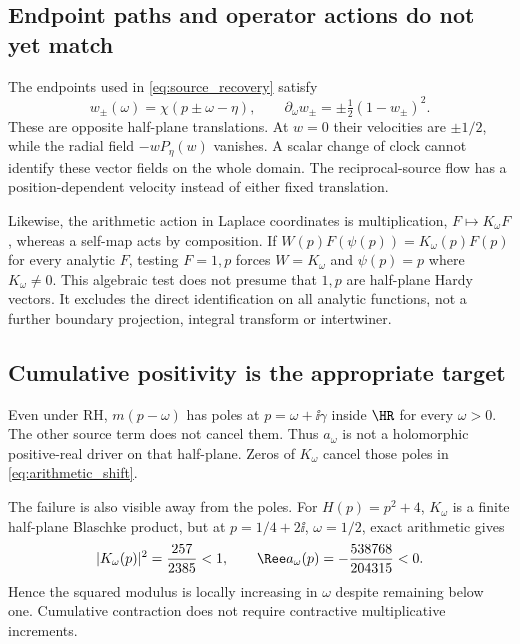 \subsection{Endpoint paths and operator actions do not yet match}

The endpoints used in \eqref{eq:source_recovery} satisfy
\begin{equation}
 w_\pm(\omega)=\chi(p\pm\omega-\eta),\qquad
 \partial_\omega w_\pm=\pm\tfrac12(1-w_\pm)^2.
\end{equation}
These are opposite half-plane translations. At $w=0$ their velocities
are $\pm1/2$, while the radial field $-wP_\eta(w)$ vanishes.
A scalar change of clock cannot identify these vector fields on the whole
domain. The reciprocal-source flow has a position-dependent velocity
instead of either fixed translation.

Likewise, the arithmetic action in Laplace coordinates is multiplication,
$F\mapsto K_\omega F$, whereas a self-map acts by composition.
If $W(p)F(\psi(p))=K_\omega(p)F(p)$ for every analytic $F$, testing
$F=1,p$ forces $W=K_\omega$ and $\psi(p)=p$ where $K_\omega\ne0$.
This algebraic test does not presume that $1,p$ are half-plane Hardy
vectors. It excludes the direct identification on all analytic functions,
not a further boundary projection, integral transform or intertwiner.

\subsection{Cumulative positivity is the appropriate target}

Even under RH, $m(p-\omega)$ has poles at $p=\omega+\ii\gamma$
inside $\HR$ for every $\omega>0$. The other source term does not
cancel them. Thus $a_\omega$ is not a holomorphic positive-real driver
on that half-plane. Zeros of $K_\omega$ cancel those poles in
\eqref{eq:arithmetic_shift}.

The failure is also visible away from the poles. For $H(p)=p^2+4$,
$K_\omega$ is a finite half-plane Blaschke product, but at
$p=1/4+2\ii$, $\omega=1/2$, exact arithmetic gives
\begin{equation}
 |K_\omega(p)|^2=\frac{257}{2385}<1,\qquad
 \Ree a_\omega(p)=-\frac{538768}{204315}<0.
 \label{eq:increment_counterexample}
\end{equation}
Hence the squared modulus is locally increasing in $\omega$ despite
remaining below one. Cumulative contraction does not require contractive
multiplicative increments.


